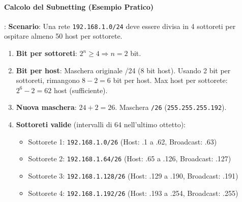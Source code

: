 \paragraph{Calcolo del Subnetting (Esempio Pratico)}:
\textbf{Scenario}: Una rete \lstinline{192.168.1.0/24} deve essere divisa in 4 sottoreti per ospitare almeno 50 host per sottorete.
\begin{enumerate}
    \item \textbf{Bit per sottoreti}: $2^n \ge 4 \Rightarrow n=2$ bit.
    \item \textbf{Bit per host}: Maschera originale /24 (8 bit host). Usando 2 bit per sottoreti, rimangono $8-2=6$ bit per host. Max host per sottorete: $2^6-2=62$ host (sufficiente).
    \item \textbf{Nuova maschera}: $24+2=26$. Maschera \lstinline{/26} (\lstinline{255.255.255.192}).
    \item \textbf{Sottoreti valide} (intervalli di 64 nell'ultimo ottetto):
    \begin{itemize}
        \item Sottorete 1: \lstinline{192.168.1.0/26} (Host: .1 a .62, Broadcast: .63)
        \item Sottorete 2: \lstinline{192.168.1.64/26} (Host: .65 a .126, Broadcast: .127)
        \item Sottorete 3: \lstinline{192.168.1.128/26} (Host: .129 a .190, Broadcast: .191)
        \item Sottorete 4: \lstinline{192.168.1.192/26} (Host: .193 a .254, Broadcast: .255)
    \end{itemize}
\end{enumerate}